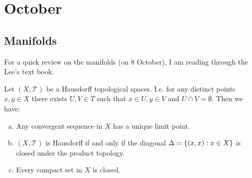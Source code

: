 \chapter{October}

\section{Manifolds}

For a quick review on the manifolds (on 8 October), I am reading through the Lee's text book.

\begin{proposition}
	Let $ (X,\mathcal{T}) $ be a Hausdorff topological spaces. I.e. for any distinct points $ x,y \in X $ there exists $ U,V \in T $ such that $ x \in U, y \in V $ and $ U\cap V = \emptyset $. Then we have:
	\begin{enumerate}[(a)]
		\item Any convergent sequence in $ X $ has a unique limit point.
		\item $ (X,\mathcal{T}) $ is Hausdorff if and only if the diagonal $ \Delta = \{(x,x): x \in X\} $ is closed under the product topology.
		\item Every compact set in $ X $ is closed.
	\end{enumerate}
	
\end{proposition}
